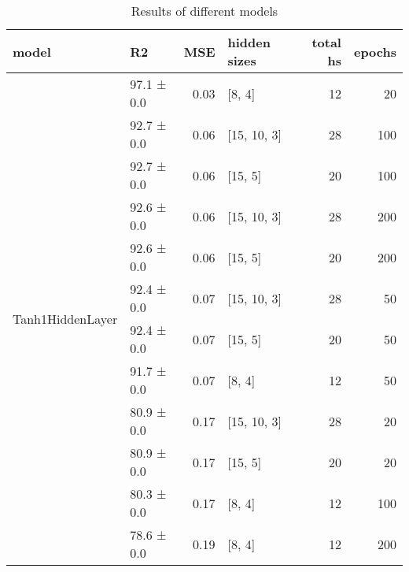 
    \begin{table*}[h]
        \centering
        \begin{tabular}{llrlrr}
\hline
 model                                     & R2         &   MSE & hidden sizes   &   total hs &   epochs \\
\hline
 \hline
\multirow{12}{*}{Tanh1HiddenLayer} & 97.1 ± 0.0 &  0.03 & [8, 4]         &         12 &       20 \\
                                           & 92.7 ± 0.0 &  0.06 & [15, 10, 3]    &         28 &      100 \\
                                           & 92.7 ± 0.0 &  0.06 & [15, 5]        &         20 &      100 \\
                                           & 92.6 ± 0.0 &  0.06 & [15, 10, 3]    &         28 &      200 \\
                                           & 92.6 ± 0.0 &  0.06 & [15, 5]        &         20 &      200 \\
                                           & 92.4 ± 0.0 &  0.07 & [15, 10, 3]    &         28 &       50 \\
                                           & 92.4 ± 0.0 &  0.07 & [15, 5]        &         20 &       50 \\
                                           & 91.7 ± 0.0 &  0.07 & [8, 4]         &         12 &       50 \\
                                           & 80.9 ± 0.0 &  0.17 & [15, 10, 3]    &         28 &       20 \\
                                           & 80.9 ± 0.0 &  0.17 & [15, 5]        &         20 &       20 \\
                                           & 80.3 ± 0.0 &  0.17 & [8, 4]         &         12 &      100 \\
                                           & 78.6 ± 0.0 &  0.19 & [8, 4]         &         12 &      200 \\
\hline
\end{tabular}
        \caption{Results of different models}
        \label{models}
    \end{table*}
    
